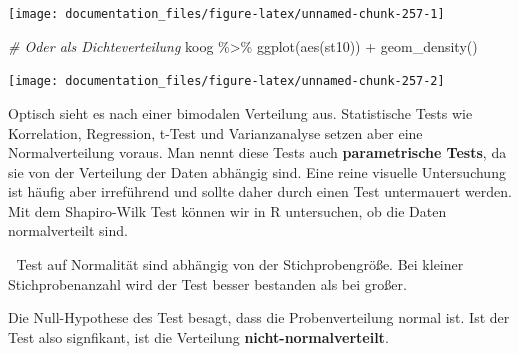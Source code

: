 \documentclass[
]{article}
\newenvironment{Shaded}{\begin{snugshade}}{\end{snugshade}}
\newcommand{\CommentTok}[1]{\textcolor[rgb]{0.56,0.35,0.01}{\textit{#1}}}
\newcommand{\DocumentationTok}[1]{\textcolor[rgb]{0.56,0.35,0.01}{\textbf{\textit{#1}}}}
\newcommand{\FunctionTok}[1]{\textcolor[rgb]{0.00,0.00,0.00}{#1}}
\newcommand{\NormalTok}[1]{#1}
\newcommand{\SpecialCharTok}[1]{\textcolor[rgb]{0.00,0.00,0.00}{#1}}
\begin{document}
\begin{center}\texttt{[image: documentation\_files/figure-latex/unnamed-chunk-257-1]} \end{center}

\begin{Shaded}
\begin{Highlighting}[]

\CommentTok{\# Oder als Dichteverteilung}
\NormalTok{koog }\SpecialCharTok{\%\textgreater{}\%}
  \FunctionTok{ggplot}\NormalTok{(}\FunctionTok{aes}\NormalTok{(st10)) }\SpecialCharTok{+}
  \FunctionTok{geom\_density}\NormalTok{()}
\end{Highlighting}
\end{Shaded}

\begin{center}\texttt{[image: documentation\_files/figure-latex/unnamed-chunk-257-2]} \end{center}

Optisch sieht es nach einer bimodalen Verteilung aus. Statistische Tests wie Korrelation, Regression, t-Test und Varianzanalyse setzen aber eine Normalverteilung voraus. Man nennt diese Tests auch \textbf{parametrische Tests}, da sie von der Verteilung der Daten abhängig sind. Eine reine visuelle Untersuchung ist häufig aber irreführend und sollte daher durch einen Test untermauert werden. Mit dem Shapiro-Wilk Test können wir in R untersuchen, ob die Daten normalverteilt sind.

🚨 Test auf Normalität sind abhängig von der Stichprobengröße. Bei kleiner Stichprobenanzahl wird der Test besser bestanden als bei großer.

Die Null-Hypothese des Test besagt, dass die Probenverteilung normal ist. Ist der Test also signfikant, ist die Verteilung \textbf{nicht-normalverteilt}.

\begin{Shaded}
\end{Shaded}
\end{document}
